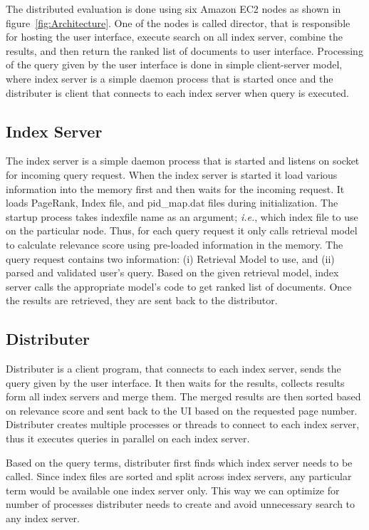 \documentclass[letterpaper,11pt,twoside]{article}
\begin{document}
The distributed evaluation is done using six Amazon EC2 nodes as shown in figure~\ref{fig:Architecture}. One of the nodes is called director, that is responsible for hosting the user interface, execute search on all index server, combine the results, and then return the ranked list of documents to user interface. Processing of the query given by the user interface is done in simple client-server model, where index server is a simple daemon process that is started once and the distributer is client that connects to each index server when query is executed.

\subsection{Index Server}

The index server is a simple daemon process that is started and listens on socket for incoming query request. When the index server is started it load various information into the memory first and then waits for the incoming request. It loads PageRank, Index file, and pid\_map.dat files during initialization. The startup process takes indexfile name as an argument; \emph{i.e.}, which index file to use on the particular node. Thus, for each query request it only calls retrieval model to calculate relevance score using pre-loaded information in the memory. The query request contains two information: (i) Retrieval Model to use, and (ii) parsed and validated user's query. Based on the given retrieval model, index server calls the appropriate model's code to get ranked list of documents. Once the results are retrieved, they are sent back to the distributor. 

\subsection{Distributer}

Distributer is a client program, that connects to each index server, sends the query given by the user interface. It then waits for the results, collects results form all index servers and merge them. The merged results are then sorted based on relevance score and sent back to the UI based on the requested page number. Distributer creates multiple processes or threads to connect to each index server, thus it executes queries in parallel on each index server. 

Based on the query terms, distributer first finds which index server needs to be called. Since index files are sorted and split across index servers, any particular term would be available one index server only. This way we can optimize for number of processes distributer needs to create and avoid unnecessary search to any index server. 
\end{document}
